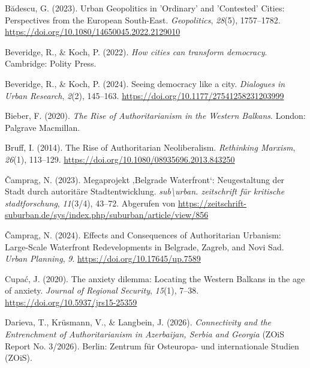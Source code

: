 \documentclass[
  ngerman,
]{agujournal2019}
\newlength{\cslhangindent}
\newenvironment{CSLReferences}[2] %
 {\begin{list}{}{%
  \setlength{\itemindent}{0pt}
  \setlength{\leftmargin}{0pt}
  \setlength{\parsep}{0pt}
  \ifodd #1
   \setlength{\leftmargin}{\cslhangindent}
   \setlength{\itemindent}{-1\cslhangindent}
  \fi
  \setlength{\itemsep}{#2\baselineskip}}}
 {\end{list}}
\begin{document}
\protect{}\label{refs}
\begin{CSLReferences}{1}{0}
\vspace{1em}

Bădescu, G. (2023). Urban Geopolitics in 'Ordinary' and 'Contested'
Cities: Perspectives from the European South-East. \emph{Geopolitics},
\emph{28}(5), 1757--1782.
\url{https://doi.org/10.1080/14650045.2022.2129010}

Beveridge, R., \& Koch, P. (2022). \emph{How cities can transform
democracy}. Cambridge: Polity Press.

Beveridge, R., \& Koch, P. (2024). Seeing democracy like a city.
\emph{Dialogues in Urban Research}, \emph{2}(2), 145--163.
\url{https://doi.org/10.1177/27541258231203999}

Bieber, F. (2020). \emph{The Rise of Authoritarianism in the Western
Balkans}. London: Palgrave Macmillan.

Bruff, I. (2014). The Rise of Authoritarian Neoliberalism.
\emph{Rethinking Marxism}, \emph{26}(1), 113--129.
\url{https://doi.org/10.1080/08935696.2013.843250}

Čamprag, N. (2023). Megaprojekt ‚{Belgrade} {Waterfront}`: Neugestaltung
der Stadt durch autorit{ä}re Stadtentwicklung.
\emph{sub\textbackslash urban. zeitschrift f{ü}r kritische
stadtforschung}, \emph{11}(3/4), 43--72. Abgerufen von
\url{https://zeitschrift-suburban.de/sys/index.php/suburban/article/view/856}

Čamprag, N. (2024). Effects and Consequences of Authoritarian Urbanism:
Large-Scale Waterfront Redevelopments in Belgrade, Zagreb, and Novi Sad.
\emph{Urban Planning}, \emph{9}. \url{https://doi.org/10.17645/up.7589}

Cupać, J. (2020). The anxiety dilemma: Locating the Western Balkans in
the age of anxiety. \emph{Journal of Regional Security}, \emph{15}(1),
7--38. \url{https://doi.org/10.5937/jrs15-25359}

Darieva, T., Krüsmann, V., \& Langbein, J. (2026). \emph{Connectivity
and the Entrenchment of Authoritarianism in {Azerbaijan}, {Serbia} and
{Georgia}} (ZOiS Report No. 3/2026). Berlin: Zentrum f{ü}r Osteuropa-
und internationale Studien (ZOiS).


\end{CSLReferences}
\end{document}
